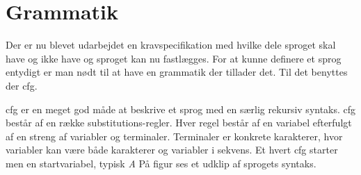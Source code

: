 \section{Grammatik}\label{sec:Gramatik}

Der er nu blevet udarbejdet en kravspecifikation med hvilke dele sproget skal have og ikke have og sproget kan nu fastlægges. For at kunne definere et sprog entydigt er man nødt til at have en grammatik der tillader det. Til det benyttes der \gls{cfg}.

\gls{cfg} er en meget god måde at beskrive et sprog med en særlig rekursiv syntaks. \gls{cfg} består af en række substitutions-regler. Hver regel består af en variabel efterfulgt af en streng af variabler og terminaler. Terminaler er konkrete karakterer, hvor variabler kan være både karakterer og variabler i sekvens. Et hvert \gls{cfg} starter men en startvariabel, typisk \textit{A} På figur  ses et udklip af sprogets syntaks.